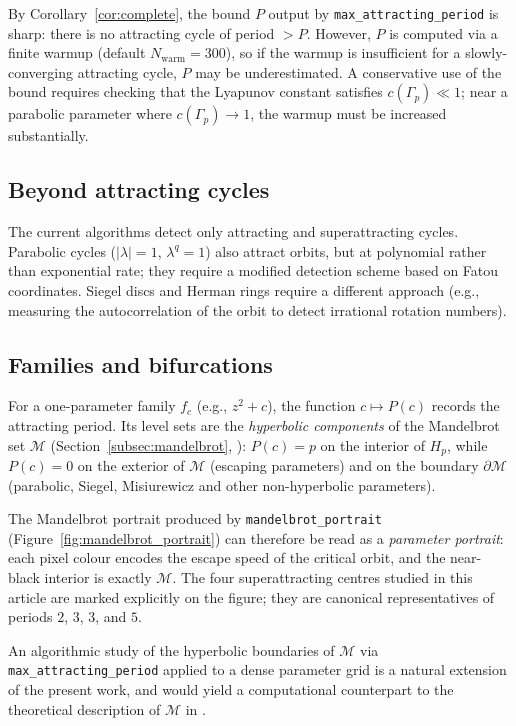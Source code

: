 \documentclass[12pt]{article}
\theoremstyle{definition}
\begin{document}
By Corollary~\ref{cor:complete}, the bound $P$ output by
\texttt{max\_attracting\_period} is sharp: there is no attracting cycle
of period $>P$.  However, $P$ is computed via a finite warmup (default
$N_{\mathrm{warm}}=300$), so if the warmup is insufficient for a
slowly-converging attracting cycle, $P$ may be underestimated.
A conservative use of the bound requires checking that the
Lyapunov constant satisfies $c(\Gamma_p)\ll 1$; near a parabolic
parameter where $c(\Gamma_p)\to 1$, the warmup must be increased substantially.

\subsection{Beyond attracting cycles}

The current algorithms detect only attracting and superattracting cycles.
Parabolic cycles ($|\lambda|=1$, $\lambda^q=1$) also attract orbits, but
at polynomial rather than exponential rate; they require a modified
detection scheme based on Fatou coordinates.  Siegel discs and Herman
rings require a different approach (e.g., measuring the autocorrelation
of the orbit to detect irrational rotation numbers).

\subsection{Families and bifurcations}

For a one-parameter family $f_c$ (e.g., $z^2+c$),
the function $c\mapsto P(c)$ records the attracting period.  Its level
sets are the \emph{hyperbolic components} of the Mandelbrot set
$\mathcal{M}$ (Section~\ref{subsec:mandelbrot}, \cite{DouadyHubbard1985}):
$P(c)=p$ on the interior of $H_p$, while $P(c)=0$ on the exterior
of $\mathcal{M}$ (escaping parameters) and on the boundary
$\partial\mathcal{M}$ (parabolic, Siegel, Misiurewicz and other
non-hyperbolic parameters).

The Mandelbrot portrait produced by \texttt{mandelbrot\_portrait}
(Figure~\ref{fig:mandelbrot_portrait}) can therefore be read as a
\emph{parameter portrait}: each pixel colour encodes the escape speed
of the critical orbit, and the near-black interior is exactly
$\mathcal{M}$.  The four superattracting centres studied in this article
are marked explicitly on the figure; they are canonical representatives
of periods $2$, $3$, $3$, and $5$.

An algorithmic study of the hyperbolic boundaries of $\mathcal{M}$ via
\texttt{max\_attracting\_period} applied to a dense parameter grid is
a natural extension of the present work, and would yield a computational
counterpart to the theoretical description of $\mathcal{M}$ in
\cite{DouadyHubbard1985}.
\end{document}
